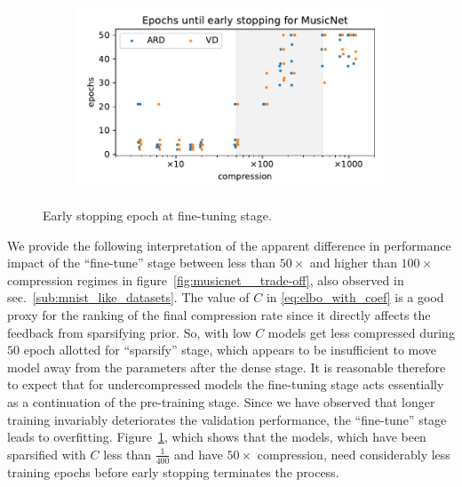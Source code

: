 \documentclass[a4paper,10pt,twocolumn]{article}
\begin{document}
\begin{figure}[!t]
  \centering
  \begin{subfigure}[b]{1.\columnwidth}  %
    \centering
    \includegraphics[width=\columnwidth]{figure__fine-tune_fx__early__compression.pdf}
  \end{subfigure}
  \caption{%
    Early stopping epoch at fine-tuning stage.
  }
  \label{fig:musicnet__early_stopping}
\end{figure}

We provide the following interpretation of the apparent difference in performance impact
of the ``fine-tune'' stage between less than $50\times$ and higher than $100\times$ compression
regimes in figure~\ref{fig:musicnet__trade-off}, also observed in sec.~\ref{sub:mnist_like_datasets}.
%
The value of $C$ in \eqref{eq:elbo_with_coef} is a good proxy for the ranking of the final
compression rate since it directly affects the feedback from sparsifying prior. So, with
low $C$ models get less compressed during $50$ epoch allotted for ``sparsify'' stage, which
appears to be insufficient to move model away from the parameters after the dense stage.
It is reasonable therefore to expect that for undercompressed models the fine-tuning stage
acts essentially as a continuation of the pre-training stage. Since we have observed that
longer training invariably deteriorates the validation performance, the ``fine-tune'' stage
leads to overfitting. Figure~\ref{fig:musicnet__early_stopping}, which shows that the models,
which have been sparsified with $C$ less than $\tfrac1{400}$ and have $50\times$ compression,
need considerably less training epochs before early stopping terminates the process.
\end{document}
